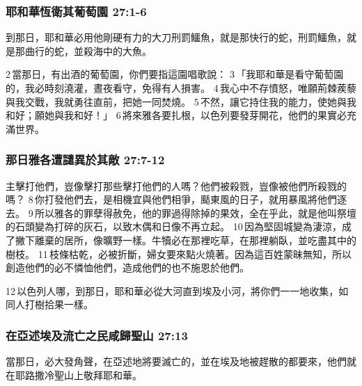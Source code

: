 \subsubsection{耶和華恆衛其葡萄園 27:1-6}
到那日，耶和華必用他剛硬有力的大刀刑罰鱷魚，就是那快行的蛇，刑罰鱷魚，就是那曲行的蛇，並殺海中的大魚。

2 當那日，有出酒的葡萄園，你們要指這園唱歌說： 3 「我耶和華是看守葡萄園的，我必時刻澆灌，晝夜看守，免得有人損害。 4 我心中不存憤怒，唯願荊棘蒺藜與我交戰，我就勇往直前，把她一同焚燒。 5 不然，讓它持住我的能力，使她與我和好；願她與我和好！」 6 將來雅各要扎根，以色列要發芽開花，他們的果實必充滿世界。

\subsubsection{那日雅各遭譴異於其敵 27:7-12}
主擊打他們，豈像擊打那些擊打他們的人嗎？他們被殺戮，豈像被他們所殺戮的嗎？ 8 你打發他們去，是相機宜與他們相爭，颳東風的日子，就用暴風將他們逐去。 9 所以雅各的罪孽得赦免，他的罪過得除掉的果效，全在乎此，就是他叫祭壇的石頭變為打碎的灰石，以致木偶和日像不再立起。 10 因為堅固城變為淒涼，成了撇下離棄的居所，像曠野一樣。牛犢必在那裡吃草，在那裡躺臥，並吃盡其中的樹枝。 11 枝條枯乾，必被折斷，婦女要來點火燒著。因為這百姓蒙昧無知，所以創造他們的必不憐恤他們，造成他們的也不施恩於他們。

12 以色列人哪，到那日，耶和華必從大河直到埃及小河，將你們一一地收集，如同人打樹拾果一樣。

\subsubsection{在亞述埃及流亡之民咸歸聖山 27:13}
當那日，必大發角聲，在亞述地將要滅亡的，並在埃及地被趕散的都要來，他們就在耶路撒冷聖山上敬拜耶和華。

